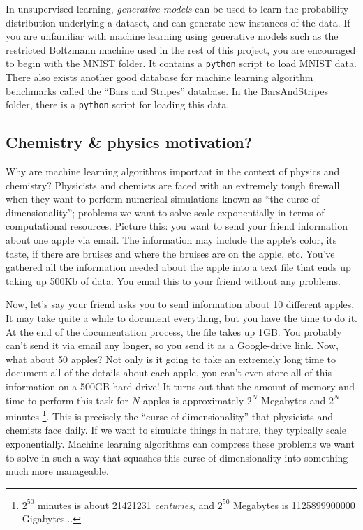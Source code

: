 \documentclass[12pt]{article}
\begin{document}
In unsupervised learning, {\it generative models} can be used to learn the probability distribution underlying a dataset, and can generate new instances of the data.
If you are unfamiliar with machine learning using generative models such as the restricted Boltzmann machine used in the rest of this project, 
you are encouraged to begin with the 
\href{https://github.com/CDL-Quantum/CohortProject_2020/tree/master/Project_1_RBM_and_Tomography/MNIST}{MNIST} folder. 
It contains a \texttt{python} script to load MNIST data. There also exists another good database for machine learning algorithm benchmarks called the ``Bars and Stripes'' database. In the \href{https://github.com/CDL-Quantum/CohortProject_2020/tree/master/Project_1_RBM_and_Tomography/BarsAndStripes}{BarsAndStripes} folder, there is a \texttt{python} script for loading this data.  

\subsection*{Chemistry \& physics motivation?}

Why are machine learning algorithms important in the context of physics and chemistry? Physicists and chemists are faced with an extremely tough firewall when they want to perform numerical simulations known as ``the curse of dimensionality''; problems we want to solve scale exponentially in terms of computational resources. Picture this: you want to send your friend information about one apple via email. The information may include the apple's color, its taste, if there are bruises and where the bruises are on the apple, etc. You've gathered all the information needed about the apple into a text file that ends up taking up 500Kb of data. You email this to your friend without any problems. 

Now, let's say your friend asks you to send information about 10 different apples. It may take quite a while to document everything, but you have the time to do it. At the end of the documentation process, the file takes up 1GB. You probably can't send it via email any longer, so you send it as a Google-drive link. Now, what about 50 apples? Not only is it going to take an extremely long time to document all of the details about each apple, you can't even store all of this information on a 500GB hard-drive! It turns out that the amount of memory and time to perform this task for $N$ apples is approximately $2^N$ Megabytes and $2^N$ minutes \footnote{$2^{50}$ minutes is about 21421231 \textit{centuries}, and $2^{50}$ Megabytes is 1125899900000 Gigabytes...}.
This is precisely the ``curse of dimensionality'' that physicists and chemists face daily. If we want to simulate things in nature, they typically scale exponentially. Machine learning algorithms can compress these problems we want to solve in such a way that squashes this curse of dimensionality into something much more manageable.
\end{document}
